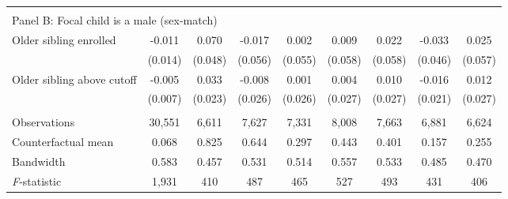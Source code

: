 {{\begin{tabular}{lcccccccc}
&  &  &  & & & & & \\
\multicolumn{10}{l}{Panel B: Focal child is a male (sex-match)} \\
Older sibling enrolled&      -0.011   &       0.070   &      -0.017   &       0.002   &       0.009   &       0.022   &      -0.033   &       0.025   \\
                    &     (0.014)   &     (0.048)   &     (0.056)   &     (0.055)   &     (0.058)   &     (0.058)   &     (0.046)   &     (0.057)   \\
 
Older sibling above cutoff&      -0.005   &       0.033   &      -0.008   &       0.001   &       0.004   &       0.010   &      -0.016   &       0.012   \\
                    &     (0.007)   &     (0.023)   &     (0.026)   &     (0.026)   &     (0.027)   &     (0.027)   &     (0.021)   &     (0.027)   \\
                    &               &               &               &               &               &               &               &               \\
Observations        &      30,551   &       6,611   &       7,627   &       7,331   &       8,008   &       7,663   &       6,881   &       6,624   \\
Counterfactual mean &       0.068   &       0.825   &       0.644   &       0.297   &       0.443   &       0.401   &       0.157   &       0.255   \\
Bandwidth           &       0.583   &       0.457   &       0.531   &       0.514   &       0.557   &       0.533   &       0.485   &       0.470   \\
\textit{F}-statistic&       1,931   &         410   &         487   &         465   &         527   &         493   &         431   &         406   \\
 

\bottomrule
\end{tabular}
}
}
